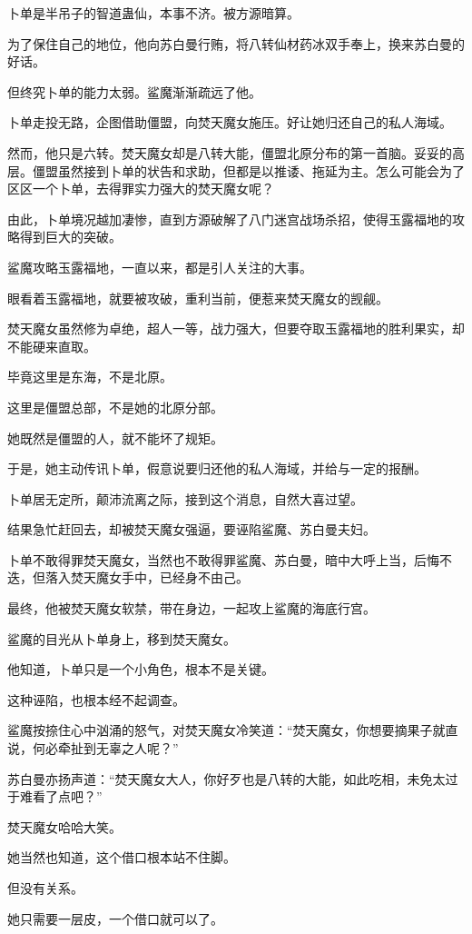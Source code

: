 \begin{this_body}
卜单是半吊子的智道蛊仙，本事不济。被方源暗算。

为了保住自己的地位，他向苏白曼行贿，将八转仙材药冰双手奉上，换来苏白曼的好话。

但终究卜单的能力太弱。鲨魔渐渐疏远了他。

卜单走投无路，企图借助僵盟，向焚天魔女施压。好让她归还自己的私人海域。

然而，他只是六转。焚天魔女却是八转大能，僵盟北原分布的第一首脑。妥妥的高层。僵盟虽然接到卜单的状告和求助，但都是以推诿、拖延为主。怎么可能会为了区区一个卜单，去得罪实力强大的焚天魔女呢？

由此，卜单境况越加凄惨，直到方源破解了八门迷宫战场杀招，使得玉露福地的攻略得到巨大的突破。

鲨魔攻略玉露福地，一直以来，都是引人关注的大事。

眼看着玉露福地，就要被攻破，重利当前，便惹来焚天魔女的觊觎。

焚天魔女虽然修为卓绝，超人一等，战力强大，但要夺取玉露福地的胜利果实，却不能硬来直取。

毕竟这里是东海，不是北原。

这里是僵盟总部，不是她的北原分部。

她既然是僵盟的人，就不能坏了规矩。

于是，她主动传讯卜单，假意说要归还他的私人海域，并给与一定的报酬。

卜单居无定所，颠沛流离之际，接到这个消息，自然大喜过望。

结果急忙赶回去，却被焚天魔女强逼，要诬陷鲨魔、苏白曼夫妇。

卜单不敢得罪焚天魔女，当然也不敢得罪鲨魔、苏白曼，暗中大呼上当，后悔不迭，但落入焚天魔女手中，已经身不由己。

最终，他被焚天魔女软禁，带在身边，一起攻上鲨魔的海底行宫。

鲨魔的目光从卜单身上，移到焚天魔女。

他知道，卜单只是一个小角色，根本不是关键。

这种诬陷，也根本经不起调查。

鲨魔按捺住心中汹涌的怒气，对焚天魔女冷笑道：“焚天魔女，你想要摘果子就直说，何必牵扯到无辜之人呢？”

苏白曼亦扬声道：“焚天魔女大人，你好歹也是八转的大能，如此吃相，未免太过于难看了点吧？”

焚天魔女哈哈大笑。

她当然也知道，这个借口根本站不住脚。

但没有关系。

她只需要一层皮，一个借口就可以了。


\end{this_body}
